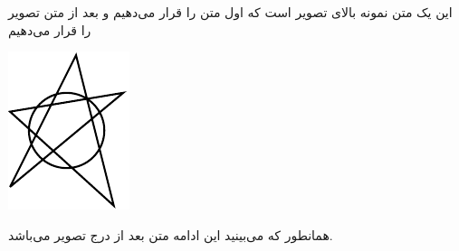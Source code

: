 \documentclass{article}
\begin{document}
این یک متن نمونه بالای تصویر است که اول متن را قرار می‌دهیم و بعد از متن تصویر را قرار می‌دهیم

\includegraphics[scale=2.0, angle=45, origin=c]{demo}

همانطور که می‌بینید این ادامه متن بعد از درج تصویر می‌باشد.
\end{document}
